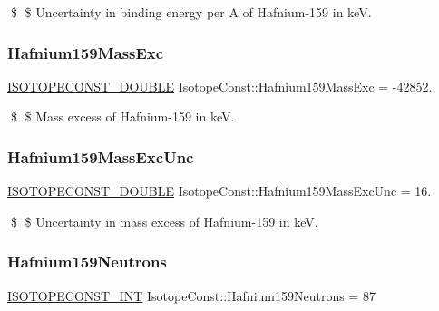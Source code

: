 \$ \$ Uncertainty in binding energy per A of Hafnium-\/159 in keV. \mbox{\label{group___isotope_const-_hafnium-_hf159_ga7d25f39987789054df75a69780a55f21}} 
\subsubsection{\texorpdfstring{Hafnium159\+Mass\+Exc}{Hafnium159MassExc}}
{\footnotesize\ttfamily \mbox{\hyperlink{group___isotope_const-_macros_ga8f45a7272ce02c0b4c65c44636ed719a}{I\+S\+O\+T\+O\+P\+E\+C\+O\+N\+S\+T\+\_\+\+D\+O\+U\+B\+LE}} Isotope\+Const\+::\+Hafnium159\+Mass\+Exc = -\/42852.}

\$ \$ Mass excess of Hafnium-\/159 in keV. \mbox{\label{group___isotope_const-_hafnium-_hf159_ga0327246825476beb5da9c3f7176cfa91}} 
\subsubsection{\texorpdfstring{Hafnium159\+Mass\+Exc\+Unc}{Hafnium159MassExcUnc}}
{\footnotesize\ttfamily \mbox{\hyperlink{group___isotope_const-_macros_ga8f45a7272ce02c0b4c65c44636ed719a}{I\+S\+O\+T\+O\+P\+E\+C\+O\+N\+S\+T\+\_\+\+D\+O\+U\+B\+LE}} Isotope\+Const\+::\+Hafnium159\+Mass\+Exc\+Unc = 16.}

\$ \$ Uncertainty in mass excess of Hafnium-\/159 in keV. \mbox{\label{group___isotope_const-_hafnium-_hf159_ga6bc10ec559a44471b781304f68354cbe}} 
\subsubsection{\texorpdfstring{Hafnium159\+Neutrons}{Hafnium159Neutrons}}
{\footnotesize\ttfamily \mbox{\hyperlink{group___isotope_const-_macros_ga5f18360b3e99483a35c32d789e62621c}{I\+S\+O\+T\+O\+P\+E\+C\+O\+N\+S\+T\+\_\+\+I\+NT}} Isotope\+Const\+::\+Hafnium159\+Neutrons = 87}

